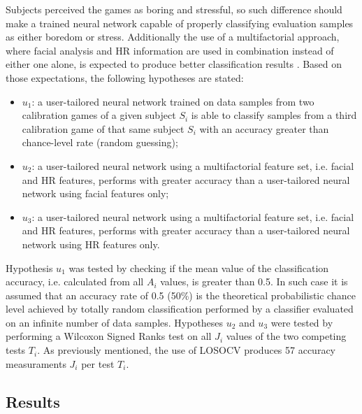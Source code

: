 Subjects perceived the games as boring and stressful, so such difference should make a trained neural network capable of properly classifying evaluation samples as either boredom or stress. Additionally the use of a multifactorial approach, where facial analysis and HR information are used in combination instead of either one alone, is expected to produce better classification results \parencite{zacharatos2014automatic}. Based on those expectations, the following hypotheses are stated:

\begin{itemize}
  \item $u_1$: a user-tailored neural network trained on data samples from two calibration games of a given subject $S_i$ is able to classify samples from a third calibration game of that same subject $S_i$ with an accuracy greater than chance-level rate (random guessing);
  \item $u_2$: a user-tailored neural network using a multifactorial feature set, i.e. facial and HR features, performs with greater accuracy than a user-tailored neural network using facial features only;
  \item $u_3$: a user-tailored neural network using a multifactorial feature set, i.e. facial and HR features, performs with greater accuracy than a user-tailored neural network using HR features only.
\end{itemize}

Hypothesis $u_1$ was tested by checking if the mean value of the classification accuracy, i.e. calculated from all $A_i$ values, is greater than 0.5. In such case it is assumed that an accuracy rate of 0.5 (50\%) is the theoretical probabilistic chance level achieved by totally random classification performed by a classifier evaluated on an infinite number of data samples. Hypotheses $u_2$ and $u_3$ were tested by performing a Wilcoxon Signed Ranks test on all $J_i$ values of the two competing tests $T_i$. As previously mentioned, the use of LOSOCV produces 57 accuracy measuraments $J_i$ per test $T_i$.

\subsection{Results}

